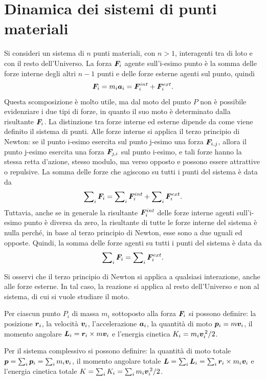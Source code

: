 \chapter{Dinamica dei sistemi di punti materiali}
Si consideri un sistema di $n$ punti materiali, con $n>1$, interagenti tra di loto e con il resto dell'Universo. La forza $\bm{F}_i$ agente sull'i-esimo punto è la somma delle forze interne degli altri $n-1$ punti e delle forze esterne agenti sul punto, quindi
\begin{equation}
    \bm{F}_i=m_i\bm{a}_i=\bm{F}_i^{int}+\bm{F}_i^{ext}.
\end{equation}
Questa scomposizione è molto utile, ma dal moto del punto $P$ non è possibile evidenziare i due tipi di forze, in quanto il suo moto è determinato dalla risultante $\bm{F}_i$. La distinzione tra forze interne ed esterne dipende da come viene definito il sistema di punti. Alle forze interne si applica il terzo principio di Newton: se il punto i-esimo esercita sul punto j-esimo una forza $\bm{F}_{i,j}$, allora il punto j-esimo esercita una forza $\bm{F}_{j,i}$ sul punto i-esimo, e tali forze hanno la stessa retta d'azione, stesso modulo, ma verso opposto e possono essere attrattive o repulsive. La somma delle forze che agiscono su tutti i punti del sistema è data da
\begin{equation}
    \sum\nolimits_i\bm{F}_i=\sum\nolimits_i\bm{F}_i^{int}+\sum\nolimits_i\bm{F}_i^{ext}.
\end{equation}
Tuttavia, anche se in generale la risultante $\bm{F}_i^{int}$ delle forze interne agenti  sull'i-esimo punto è diversa da zero, la risultante di tutte le forze interne del sistema è nulla perché, in base al terzo principio di Newton, esse sono a due uguali ed opposte. Quindi, la somma delle forze agenti su tutti i punti del sistema è data da
\begin{equation}
    \sum\nolimits_i\bm{F}_i=\sum\nolimits_i\bm{F}_i^{ext}.
\end{equation}
\begin{obs}
    Si osservi che il terzo principio di Newton si applica a qualsiasi interazione, anche alle forze esterne. In tal caso, la reazione si applica al resto dell'Universo e non al sistema, di cui si vuole studiare il moto. 
\end{obs}
Per ciascun punto $P_i$ di massa $m_i$ sottoposto alla forza $\bm{F}_i$ si possono definire: la posizione $\bm{r}_i$, la velocità $\bm{v}_i$, l'accelerazione $\bm{a}_i$, la quantità di moto $\bm{p}_i=m\bm{v}_i$, il momento angolare $\bm{L}_i=\bm{r}_i\times m\bm{v}_i$ e l'energia cinetica $K_i=m_i\bm{v}_i^{\,2}/2$.

Per il sistema complessivo si possono definire: la quantità di moto totale $\bm{p}=\sum\nolimits_i\bm{p}_i=\sum_im_i\bm{v}_i$, il momento angolare totale $\bm{L}=\sum_i\bm{L}_i=\sum_i\bm{r}_i\times m_i\bm{v}_i$ e l'energia cinetica totale $K=\sum_iK_i=\sum_im_i\bm{v}_i^{\,2}/2$.

